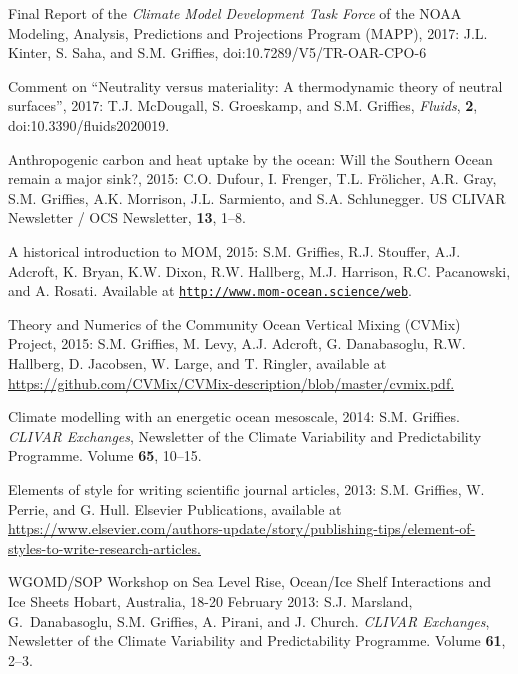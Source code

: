\begin{etaremune}
\item Final Report of the {\it Climate Model Development Task Force} of the NOAA Modeling, Analysis, Predictions and Projections Program (MAPP), 2017: J.L. Kinter, S. Saha, and S.M. Grif\/fies, doi:10.7289/V5/TR-OAR-CPO-6

\item Comment on ``Neutrality versus materiality: A thermodynamic theory of neutral surfaces'', 2017: T.J. McDougall, S. Groeskamp, and S.M. Grif\/fies, {\it Fluids}, {\bf 2},  doi:10.3390/fluids2020019.

\item Anthropogenic carbon and heat uptake by the ocean: Will the Southern Ocean remain a major sink?, 2015: C.O. Dufour, I. Frenger, T.L. Fr\"{o}licher, A.R. Gray, S.M. Grif\/f\/ies, A.K. Morrison, J.L. Sarmiento, and S.A. Schlunegger.  US CLIVAR Newsletter / OCS Newsletter, {\bf 13}, 1--8.

\item A historical introduction to MOM, 2015: S.M. Grif\/f\/ies, R.J. Stouffer, A.J. Adcroft, K. Bryan, K.W. Dixon, R.W. Hallberg, M.J. Harrison, R.C. Pacanowski, and A. Rosati.  Available at \href{\tt  http://www.mom-ocean.science/web/docs/project/mom_history_v15.09.05.pdf}{\tt http://www.mom-ocean.science/web}.
  
  
\item Theory and Numerics of the Community Ocean Vertical Mixing (CVMix) Project, 2015: S.M. Grif\/f\/ies, M. Levy, A.J. Adcroft, G. Danabasoglu, R.W. Hallberg, D. Jacobsen, W. Large, and T. Ringler, available at \href{https://github.com/CVMix/CVMix-description/blob/master/cvmix.pdf}{https://github.com/CVMix/CVMix-description/blob/master/cvmix.pdf.}

\item Climate modelling with an energetic ocean mesoscale, 2014: S.M. Grif\/f\/ies.  {\em CLIVAR Exchanges}, Newsletter of the Climate Variability and Predictability Programme.  Volume {\bf 65}, 10--15.

\item Elements of style for writing scientific journal articles, 2013: S.M. Grif\/f\/ies, W. Perrie, and G. Hull. Elsevier Publications, available at \href{https://www.elsevier.com/authors-update/story/publishing-tips/element-of-styles-to-write-research-articles}{https://www.elsevier.com/authors-update/story/publishing-tips/element-of-styles-to-write-research-articles.}

\item WGOMD/SOP Workshop on Sea Level Rise, Ocean/Ice Shelf Interactions and Ice Sheets Hobart, Australia, 18-20 February 2013: S.J. Marsland, G.\ Danabasoglu, S.M. Grif\/f\/ies, A. Pirani, and J. Church.  {\em CLIVAR Exchanges}, Newsletter of the Climate Variability and Predictability Programme.  Volume {\bf 61}, 2--3.


\end{etaremune}
